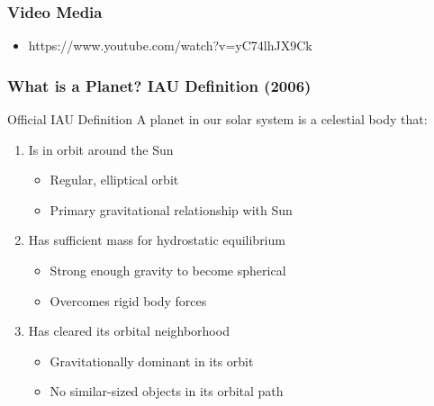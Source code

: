 \documentclass{beamer}
\begin{document}
\begin{frame}
\frametitle{Video Media}
\begin{itemize}
  \item https://www.youtube.com/watch?v=yC74lhJX9Ck
\end{itemize}
\end{frame}


\begin{frame}
\frametitle{What is a Planet? IAU Definition (2006)}

\begin{block}{Official IAU Definition}
A planet in our solar system is a celestial body that:
\end{block}

\begin{enumerate}
    \item Is in orbit around the Sun
    \begin{itemize}
        \item Regular, elliptical orbit
        \item Primary gravitational relationship with Sun
    \end{itemize}
    
    \item Has sufficient mass for hydrostatic equilibrium
    \begin{itemize}
        \item Strong enough gravity to become spherical
        \item Overcomes rigid body forces
    \end{itemize}
    
    \item Has cleared its orbital neighborhood
    \begin{itemize}
        \item Gravitationally dominant in its orbit
        \item No similar-sized objects in its orbital path
    \end{itemize}
\end{enumerate}
\end{frame}
\end{document}
